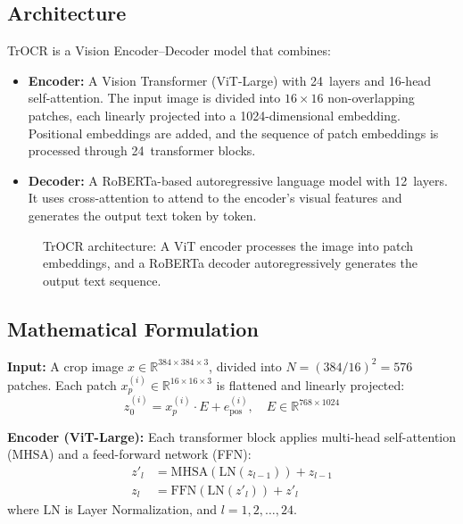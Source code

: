 \documentclass[12pt,a4paper,oneside]{report}
\begin{document}
\subsection{Architecture}

TrOCR is a Vision Encoder--Decoder model that combines:
\begin{itemize}
  \item \textbf{Encoder:} A Vision Transformer (ViT-Large) with 24~layers and 16-head self-attention. The input image is divided into $16 \times 16$ non-overlapping patches, each linearly projected into a 1024-dimensional embedding. Positional embeddings are added, and the sequence of patch embeddings is processed through 24~transformer blocks.
  \item \textbf{Decoder:} A RoBERTa-based autoregressive language model with 12~layers. It uses cross-attention to attend to the encoder's visual features and generates the output text token by token.
\end{itemize}

\begin{figure}[H]
\centering
\caption{TrOCR architecture: A ViT encoder processes the image into patch embeddings, and a RoBERTa decoder autoregressively generates the output text sequence.}
\label{fig:trocr_arch}
\end{figure}

\subsection{Mathematical Formulation}

\textbf{Input:} A crop image $x \in \mathbb{R}^{384 \times 384 \times 3}$, divided into $N = (384/16)^2 = 576$ patches. Each patch $x_p^{(i)} \in \mathbb{R}^{16 \times 16 \times 3}$ is flattened and linearly projected:
\begin{equation}
z_0^{(i)} = x_p^{(i)} \cdot E + e_{\text{pos}}^{(i)}, \quad E \in \mathbb{R}^{768 \times 1024}
\end{equation}

\textbf{Encoder (ViT-Large):} Each transformer block applies multi-head self-attention (MHSA) and a feed-forward network (FFN):
\begin{align}
z'_l &= \text{MHSA}(\text{LN}(z_{l-1})) + z_{l-1} \\
z_l &= \text{FFN}(\text{LN}(z'_l)) + z'_l
\end{align}
where $\text{LN}$ is Layer Normalization, and $l = 1, 2, \ldots, 24$.
\end{document}
